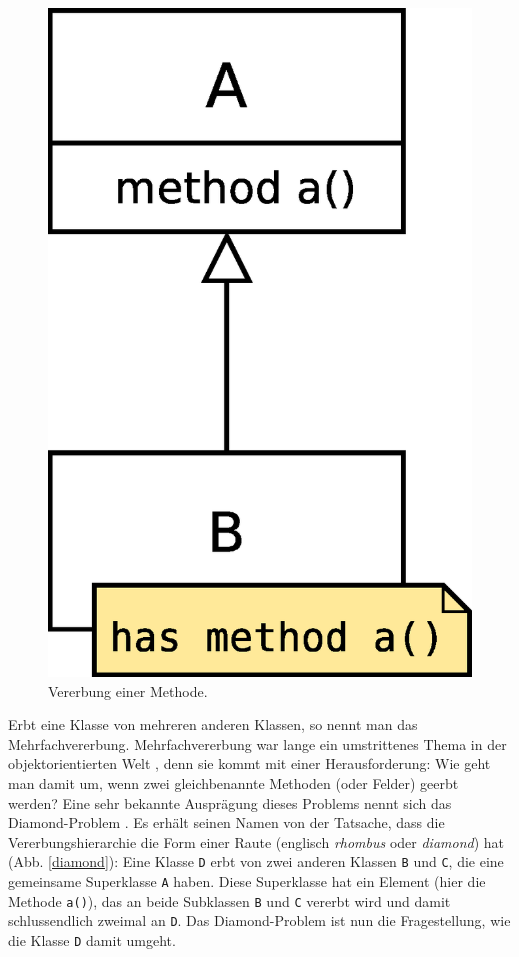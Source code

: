 \begin{figure}[h]
\centering
 \includegraphics[scale = 0.27]{pictures/inheritance}
 \caption{Vererbung einer Methode.}
 \label{inheritance}
\end{figure}

Erbt eine Klasse von mehreren anderen Klassen, so nennt man das Mehrfachvererbung. Mehrfachvererbung war lange ein umstrittenes Thema in der objektorientierten Welt \cite{mi1}\cite{mi2}, denn sie kommt mit einer Herausforderung: Wie geht man damit um, wenn zwei gleichbenannte Methoden (oder Felder) geerbt werden? Eine sehr bekannte Ausprägung dieses Problems nennt sich das Diamond-Problem \cite{dp}. Es erhält seinen Namen von der Tatsache, dass die Vererbungshierarchie die Form einer Raute (englisch \emph{rhombus} oder \emph{diamond}) hat (Abb. \ref{diamond}):
Eine Klasse \texttt{D} erbt von zwei anderen Klassen \texttt{B} und \texttt{C}, die eine gemeinsame Superklasse \texttt{A} haben. Diese Superklasse hat ein Element (hier die Methode \texttt{a()}), das an beide Subklassen \texttt{B} und \texttt{C} vererbt wird und damit schlussendlich zweimal an \texttt{D}. Das Diamond-Problem ist nun die Fragestellung, wie die Klasse \texttt{D} damit umgeht.

